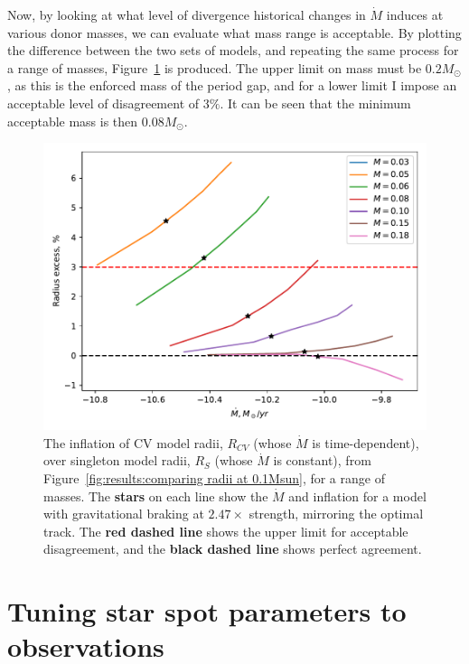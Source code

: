 Now, by looking at what level of divergence historical changes in $\dot M$ induces at various donor masses, we can evaluate what mass range is acceptable.
By plotting the difference between the two sets of models, and repeating the same process for a range of masses, Figure~\ref{fig:results:comparing radii over a range of masses} is produced.
The upper limit on mass must be $0.2 M_\odot$, as this is the enforced mass of the period gap, and for a lower limit I impose an acceptable level of disagreement of $3\%$. It can be seen that the minimum acceptable mass is then $0.08 M_\odot$.
\begin{figure}
    \centering
    \includegraphics[width=\textwidth]{figures/modelling/compare_multiple_mass_with_CV_K11_fig1a.pdf}
    \caption{The inflation of CV model radii, $R_{CV}$ (whose $\dot M$ is time-dependent), over singleton model radii, $R_S$ (whose $\dot M$ is constant), from Figure~\ref{fig:results:comparing radii at 0.1Msun}, for a range of masses. The {\bf stars} on each line show the $\dot M$ and inflation for a model with gravitational braking at $2.47\times$ strength, mirroring the \citet{knigge11} optimal track. The {\bf red dashed line} shows the upper limit for acceptable disagreement, and the {\bf black dashed line} shows perfect agreement.}
    \label{fig:results:comparing radii over a range of masses}
\end{figure}



\section{Tuning star spot parameters to observations}
\label{sect:modelling:tuning star spots to observations}

